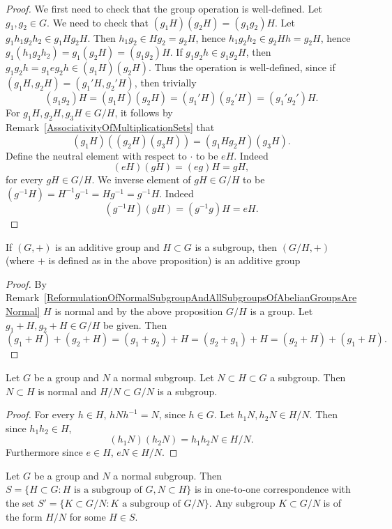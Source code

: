 \begin{proof}
    We first need to check that the group operation is well-defined. Let $g_1,g_2\in G$. We need to check that $(g_1H)(g_2H) = (g_1g_2) H$. Let $g_1h_1g_2h_2\in g_1Hg_2H$. Then $h_1g_2\in Hg_2 = g_2H$, hence $h_1g_2h_2\in g_2Hh = g_2H$, hence $g_1(h_1g_2h_2) = g_1(g_2H)=(g_1g_2)H.$ If $g_1g_2h \in g_1g_2H$, then $g_1g_2h = g_1eg_2h\in (g_1H)(g_2H)$. Thus the operation is well-defined, since if $(g_1H,g_2H)=(g_1'H,g_2'H)$, then trivially 
    $$(g_1g_2)H=(g_1H)(g_2H) =(g_1'H)(g_2'H) = (g_1'g_2')H.$$
    For $g_1H,g_2H,g_3H\in G/H$, it follows by Remark~\ref{AssociativityOfMultiplicationSets} that 
    $$(g_1H)((g_2H)(g_3H)) = (g_1Hg_2H)(g_3H).$$
    Define the neutral element with respect to $\cdot$ to be $eH$. Indeed
    $$
        (eH)(gH) = (eg)H=gH,
    $$
    for every $gH\in G/H$. We inverse element of $gH\in G/H$ to be $(g^{-1}H) = H^{-1}g^{-1} = Hg^{-1} = g^{-1}H$. Indeed 
    $$
        (g^{-1}H)(gH) = (g^{-1}g)H= eH.
    $$
\end{proof}
\begin{corollary}\label{QuotientGroupOfAdditiveGroupIsAdditive}
    If $(G,+)$ is an additive group and $H\subset G$ is a subgroup, then $(G/H,+)$ (where $+$ is defined as in the above proposition) is an additive group
\end{corollary}
\begin{proof}
    By Remark~\ref{ReformulationOfNormalSubgroupAndAllSubgroupsOfAbelianGroupsAreNormal} $H$ is normal and by the above proposition $G/H$ is a group. Let $g_1+H,g_2+H\in G/H$ be given. Then
    $$(g_1+H)+(g_2+H) = (g_1+g_2)+H = (g_2+g_1)+H = (g_2+H)+(g_1+H).$$
\end{proof}
\begin{lemma}\label{SubgroupOfQuoutientGroup}
    Let $G$ be a group and $N$ a normal subgroup. Let $N\subset H\subset G$ a subgroup. Then $N\subset H$ is normal and $H/N \subset G/N$ is a subgroup.  
\end{lemma}
\begin{proof}
    For every $h\in H$, $hNh^{-1} = N$, since $h\in G$. Let $h_1N,h_2N\in H/N$. Then since $h_1h_2\in H$, 
    $$(h_1N)(h_2N)=h_1h_2N \in H/N.$$
    Furthermore since $e\in H$, $eN \in H/N.$
\end{proof}
\begin{proposition}\label{ClassificationOfSubgroupsOfQuotientGroup}
    Let $G$ be a group and $N$ a normal subgroup. Then \\ $S =\{H\subset G : H \text{ is a subgroup of } G, N\subset H\}$ is in one-to-one correspondence with the set $S' = \{ K \subset G/N : K \text{ a subgroup of } G/N\}.$ Any subgroup $K\subset G/N$ is of the form $H/N$ for some $H\in S$.
\end{proposition}
